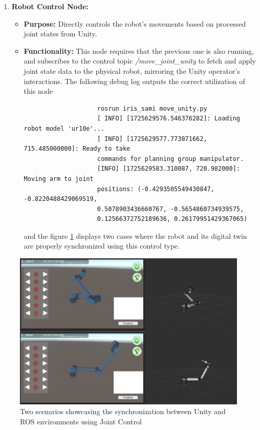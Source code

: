 \begin{enumerate}
        \item \textbf{Robot Control Node:}
            \begin{itemize}
                \item \textbf{Purpose:} Directly controls the robot's movements based on processed joint states from Unity.
                \item \textbf{Functionality:} This node requires that the previous one is also running, and subscribes to the control topic \textit{/move\_joint\_unity} to fetch and apply joint state data to the physical robot, mirroring the Unity operator’s interactions. The following debug log outputs the correct utilization of this node
                \begin{verbatim}
                    rosrun iris_sami move_unity.py 
                    [ INFO] [1725629576.546376282]: Loading robot model 'ur10e'...
                    [ INFO] [1725629577.773871662, 715.485000000]: Ready to take
                    commands for planning group manipulator.
                    [INFO] [1725629583.310087, 720.982000]: Moving arm to joint 
                    positions: (-0.4293505549430847, -0.8220488429069519,
                    0.5078903436660767, -0.5654860734939575,
                    0.12566372752189636, 0.26179951429367065)
                \end{verbatim}
            
                and the figure \ref{fig:synchronization-joint-control} displays two cases where the robot and its digital twin are properly synchronized using this control type.
            \end{itemize}
    \end{enumerate}
    
    \begin{figure}[b!]
        \centering
        \includegraphics[width=1\linewidth]{figs/montagem.png}
        \caption{Two scenarios showcasing the synchronization between Unity and ROS environments using Joint Control}
        \label{fig:synchronization-joint-control}
    \end{figure}




